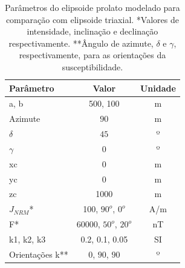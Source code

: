 \begin{table}[h!]
	\begin{center}
		\begin{tabular}{|l|c|c|}
			\hline
			\textbf{Parâmetro}  & \textbf{Valor}  & \textbf{Unidade}\\
			\hline 
			a, b  & 500, 100 & m\\
			\hline
			Azimute   & $90$ & m\\
			\hline
			$\delta$    & $45$ & º\\
			\hline
			$\gamma$   & $0$  & º\\
			\hline
			xc   & 0  & m\\
			\hline          
			yc   & 0  & m\\
			\hline                
			zc   & 1000  & m\\
			\hline
			$J_{NRM}$*  & 100, $90^o$, $0^o$  & A/m\\
			\hline
			F*    & 60000, $50^o$, $20^o$ & nT\\
			\hline
			k1, k2, k3   & 0.2, 0.1, 0.05  & SI\\
			\hline
			Orientações k**   & $0$, $90$, $90$  & º\\
			\hline
		\end{tabular}
		\caption{Parâmetros do elipsoide prolato modelado para comparação com elipsoide triaxial. *Valores de intensidade, inclinação e declinação respectivamente. **Ângulo de azimute, $\delta$ e $\gamma$, respectivamente, para as orientações da susceptibilidade.}
	\end{center}
	\label{tab:triaxial_prolate2}
\end{table}


